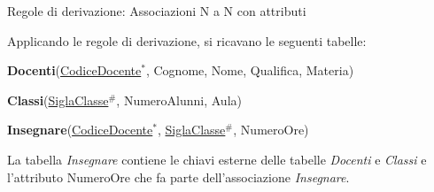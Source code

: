 \begin{frame}{Regole di derivazione: Associazioni N a N con attributi}
\begin{center}
\end{center}
\pause

Applicando le regole di derivazione, si ricavano le seguenti tabelle:

\pause

\textbf{Docenti}(\underline{CodiceDocente}$^*$, Cognome, Nome, Qualifica, Materia)
\pause

\textbf{Classi}(\underline{SiglaClasse}$^\#$, NumeroAlunni, Aula)

\pause

\textbf{Insegnare}(\underline{CodiceDocente}$^*$, \underline{SiglaClasse}$^\#$, NumeroOre)

\pause
La tabella \textit{Insegnare} contiene le chiavi esterne delle tabelle \textit{Docenti} e \textit{Classi} e l'attributo NumeroOre che fa parte dell'associazione \textit{Insegnare}.
\end{frame}
%
